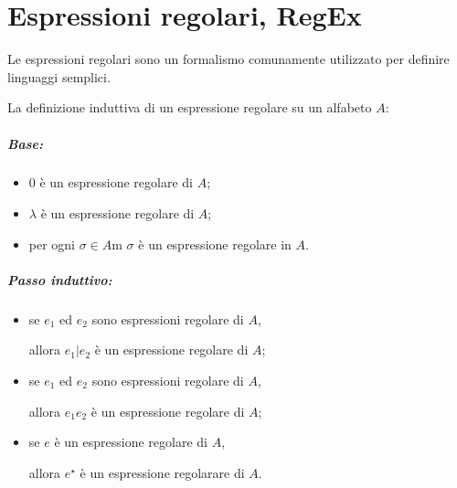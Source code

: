 \chapter{Espressioni regolari, RegEx}
Le espressioni regolari sono un formalismo comunamente utilizzato per definire
linguaggi semplici.

\begin{theorem}
  La definizione induttiva di un espressione regolare su un alfabeto $A$:
  \paragraph{Base:}
  \begin{itemize}
    \item $0$ è un espressione regolare di $A$;
    \item $\lambda$ è un espressione regolare di $A$;
    \item per ogni $\sigma\in A$m $\sigma$ è un espressione regolare in $A$.
  \end{itemize}
  
  \paragraph{Passo induttivo:}
  \begin{itemize}
    \item se $e_1$ ed $e_2$ sono espressioni regolare di $A$,

      allora $e_1|e_2$ è un espressione regolare di $A$;
    \item se $e_1$ ed $e_2$ sono espressioni regolare di $A$,

      allora $e_1 e_2$ è un espressione regolare di $A$;
    \item se $e$ è un espressione regolare di $A$,

      allora $e^\star$ è un espressione regolarare di $A$.
  \end{itemize}
\end{theorem}
